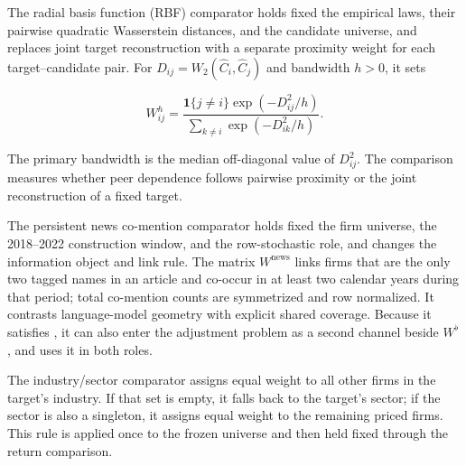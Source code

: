 The radial basis function (RBF) comparator holds fixed the empirical laws,
their pairwise quadratic
Wasserstein distances, and the candidate universe, and replaces joint target
reconstruction with a separate proximity weight for each target--candidate
pair.
For $D_{ij}=W_2(\widehat C_i,\widehat C_j)$ and bandwidth $h>0$, it sets

\[
  W^h_{ij}
  =\frac{\mathbf{1}\{j\ne i\}\exp(-D_{ij}^2/h)}
  {\sum_{k\ne i}\exp(-D_{ik}^2/h)}.
\]

The primary bandwidth is the median off-diagonal value of $D_{ij}^2$.
The comparison measures whether peer dependence follows pairwise proximity or
the joint reconstruction of a fixed target.

The persistent news co-mention comparator holds fixed the firm universe, the
2018--2022 construction window, and the row-stochastic role, and changes the
information object and link rule.
The matrix $W^{\mathrm{news}}$ links firms that are the only two tagged names in
an article and co-occur in at least two calendar years during that period;
total co-mention counts are symmetrized and row normalized.
It contrasts language-model geometry with explicit shared coverage.
Because it satisfies , it can also enter the
adjustment problem as a second channel beside $W^\flat$, and
 uses it in both roles.

The industry/sector comparator assigns equal weight to all other firms in the
target's industry. If that set is empty, it falls back to the target's sector;
if the sector is also a singleton, it assigns equal weight to the remaining
priced firms. This rule is applied once to the frozen universe and then held
fixed through the return comparison.
